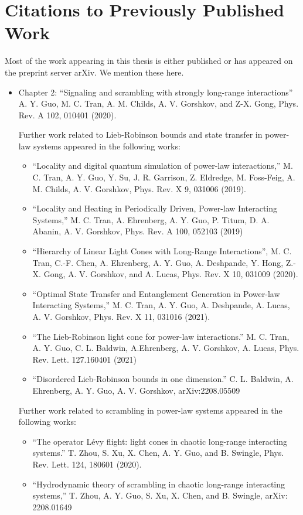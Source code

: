 \newpage
\section*{Citations to Previously Published Work}
Most of the work appearing in this thesis is either published or has appeared on the preprint server arXiv. We mention these here.

\begin{itemize}
    \item Chapter 2: ``Signaling and scrambling with strongly long-range interactions''
    A. Y. Guo, M. C. Tran, A. M. Childs, A. V. Gorshkov, and Z-X. Gong, Phys. Rev. A 102, 010401 (2020).

    Further work related to Lieb-Robinson bounds and state transfer in power-law systems appeared in the following works:
    \begin{itemize}
        \item ``Locality and digital quantum simulation of power-law interactions,'' M. C. Tran, A. Y. Guo, Y. Su, J. R. Garrison, Z. Eldredge, M. Foss-Feig, A. M. Childs, A. V. Gorshkov, Phys. Rev. X 9, 031006 (2019).
        \item ``Locality and Heating in Periodically Driven, Power-law Interacting Systems,'' M. C. Tran, A. Ehrenberg, A. Y. Guo, P. Titum, D. A. Abanin, A. V. Gorshkov, Phys. Rev. A 100, 052103 (2019)
        \item ``Hierarchy of Linear Light Cones with Long-Range Interactions'', M. C. Tran, C.-F. Chen, A. Ehrenberg, A. Y. Guo, A. Deshpande, Y. Hong, Z.-X. Gong, A. V. Gorshkov, and A. Lucas, Phys. Rev. X 10, 031009 (2020).
        \item ``Optimal State Transfer and Entanglement Generation in Power-law Interacting Systems,'' M. C. Tran, A. Y. Guo, A. Deshpande, A. Lucas, A. V. Gorshkov, Phys. Rev. X 11, 031016 (2021).
        \item ``The Lieb-Robinson light cone for power-law interactions.'' M. C. Tran, A. Y. Guo, C. L. Baldwin, A.Ehrenberg, A. V. Gorshkov, A. Lucas, Phys. Rev. Lett. 127.160401 (2021)
        \item ``Disordered Lieb-Robinson bounds in one dimension.'' C. L. Baldwin, A. Ehrenberg, A. Y. Guo, A. V. Gorshkov, arXiv:2208.05509
    \end{itemize}

    Further work related to scrambling in power-law systems appeared in the following works:
    \begin{itemize}
        \item ``The operator Lévy flight: light cones in chaotic long-range interacting systems.'' T. Zhou, S. Xu, X. Chen, A. Y. Guo, and B. Swingle, Phys. Rev. Lett. 124, 180601 (2020).
        \item ``Hydrodynamic theory of scrambling in chaotic long-range interacting systems,'' T. Zhou, A. Y. Guo, S. Xu, X. Chen, and B. Swingle, arXiv: 2208.01649
    \end{itemize}


\end{itemize}
